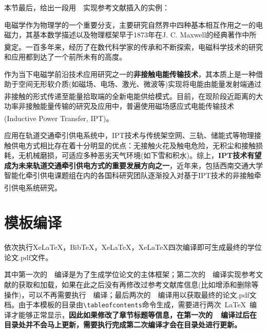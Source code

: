 \par
本节最后，给出一段用~\BibTeX{}~实现参考文献插入的实例：

\begin{framed}
	电磁学作为物理学的一个重要分支，主要研究自然界中四种基本相互作用之一的电磁力，其基本数学描述以及物理框架早于1873年在J. C. Maxwell的经典著作\cite{Maxwell1873}中所奠定。一百多年来，经历了在数代科学家的传承和不断探索\textsuperscript{\cite{Stratton1941,Cheng1989,Jackson1999,Guru2004,Kong2008,Griffiths2012,Purcell2013,Ida2015}}，电磁科学技术的研究和应用都到达了一个前所未有的高度。
	
	作为当下电磁学前沿技术应用研究之一的\textbf{非接触电能传输技术}，其本质上是一种借助于空间无形软介质(如磁场、电场、激光、微波等)实现将电能由能量发射端通过非接触的形式传递至能量拾取端的全新电能供给模式\textsuperscript{\cite{黄学良2013}}。目前，在现阶段近距离的大功率非接触能量传输的研究及应用中，普遍使用磁场感应式电能传输技术(Inductive Power Transfer, IPT)\textsuperscript{\cite{covic2013inductive}}。
	
	应用在轨道交通牵引供电系统中，IPT技术与传统架空网、三轨、储能式等物理接触供电方式相比存在着十分明显的优点：无接触火花及触电危险，无积尘和接触损耗，无机械磨损，可适应多种恶劣天气环境(如下雪和积水)。综上，\textbf{IPT技术有望成为未来轨道交通牵引供电方式的重要发展方向之一}，近年来，包括西南交通大学智能化牵引供电课题组在内的各国科研究团队逐渐投入对基于IPT技术的非接触牵引供电系统研究\textsuperscript{\cite{Buja2015,Kim2015}}。
\end{framed}

\section{模板编译}
依次执行XeLaTeX，BibTeX，XeLaTeX，XeLaTeX四次编译即可生成最终的学位论文.pdf文件。

\par
其中第一次的~\XeLaTeX{}~编译是为了生成学位论文的主体框架；第二次的~\BibTeX{}~编译实现参考文献的获取和加载，如果在此之后没有再修改过参考文献库信息(比如增添和删除等操作)，可以不再需要执行~\BibTeX{}~编译；最后两次的~\XeLaTeX{}~编译用以获取最终的论文.pdf文档。由于本模板的目录由\verb|\tableofcontents|命令生成，需要进行两次~\LaTeX~编译才能够正常显示，\textbf{因此如果修改了章节标题等信息，在第一次的~\XeLaTeX{}~编译过后在目录处并不会马上更新，需要执行完成第二次编译才会在目录处进行更新。}